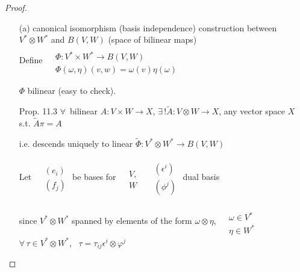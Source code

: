 \begin{proof}
\begin{enumerate}
\item[(a)] canonical isomorphism (basis independence) construction between $V^* \otimes W^*$ and $B(V,W)$ (space of bilinear maps) \\

Define $\begin{aligned} & \quad \\
  & \Phi : V^* \times W^* \to B(V,W) \\
  & \Phi(\omega, \eta)(v,w) = \omega(v) \eta(\omega) \end{aligned}$

$\Phi$ bilinear (easy to check).  

Prop. 11.3  $\forall \, $ bilinear $A: V\times W \to X$, $\exists \, ! \widetilde{A} : V\otimes W \to X$, any vector space $X$ s.t. $\widetilde{A} \pi = A$


i.e. descends uniquely to linear $\widetilde{\Phi} : V^* \otimes W^* \to B(V,W)$

Let $\begin{aligned} & \quad \\
  & (e_i) \\ 
  & (f_j) \end{aligned}$ be bases for $\begin{aligned} & \quad \\ 
  & V, \\
  & W \end{aligned}$ \quad $\begin{aligned} & \quad \\ 
  & (\epsilon^i) \\ 
  & (\phi^j) \end{aligned}$ \quad dual basis 

since $V^* \otimes W^*$ spanned by elements of the form $\omega \otimes \eta$, $\begin{aligned} & \quad \\ & \omega \in V^* \\
 & \eta \in W^* \end{aligned}$ \\
$\forall \, \tau \in V^* \otimes W^*$, \, $\tau = \tau_{ij} \epsilon^i \otimes \varphi^j $


\end{enumerate}
\end{proof}

